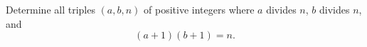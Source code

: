 Determine all triples $(a,b,n)$ of positive integers where $a$ divides $n$, $b$ divides $n$, and
$$(a+1)(b+1) = n.$$
